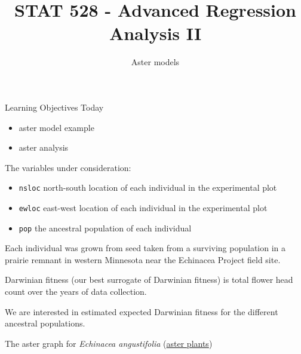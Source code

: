 \documentclass[
  ignorenonframetext,
]{beamer}
\title{STAT 528 - Advanced Regression Analysis II}
\author{Aster models}
\date{}
\institute{Daniel J. Eck\\
Department of Statistics\\
University of Illinois}
\providecommand{\tightlist}{%
  \setlength{\itemsep}{0pt}\setlength{\parskip}{0pt}}
\begin{document}
\frame{\titlepage}

\begin{frame}
\newcommand{\R}{\mathbb{R}}
\end{frame}

\begin{frame}{Learning Objectives Today}
\protect\hypertarget{learning-objectives-today}{}
\begin{itemize}
\tightlist
\item
  aster model example
\item
  aster analysis
\end{itemize}
\end{frame}

\begin{frame}{}
\protect\hypertarget{section}{}
The variables under consideration:

\begin{itemize}
\tightlist
\item
  \texttt{nsloc} north-south location of each individual in the
  experimental plot
\item
  \texttt{ewloc} east-west location of each individual in the
  experimental plot
\item
  \texttt{pop} the ancestral population of each individual
\end{itemize}

\vspace{12pt}

Each individual was grown from seed taken from a surviving population in
a prairie remnant in western Minnesota near the Echinacea Project field
site.

Darwinian fitness (our best surrogate of Darwinian fitness) is total
flower head count over the years of data collection.

We are interested in estimated expected Darwinian fitness for the
different ancestral populations.
\end{frame}

\begin{frame}{The aster graph for \emph{Echinacea angustifolia}
(\href{http://echinaceaproject.org/}{aster plants})}
\protect\hypertarget{the-aster-graph-for-aster-plants}{}
\begin{figure}
\label{fig:astergraph}
\end{figure}
\end{frame}
\end{document}
